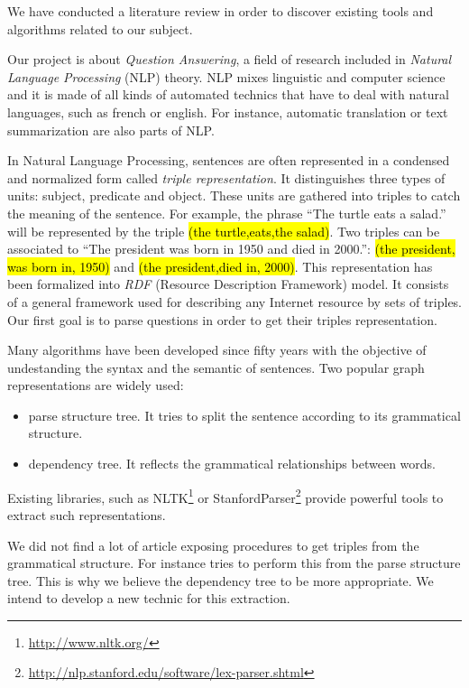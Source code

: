 We have conducted a literature review in order to discover existing tools and algorithms related to our subject. 

Our project is about \textit{Question Answering}, a field of research included in \textit{Natural Language Processing} (NLP) theory. NLP mixes linguistic and computer science and it is made of all kinds of automated technics that have to deal with natural languages, such as french or english. For instance, automatic translation or text summarization are also parts of NLP.

In Natural Language Processing, sentences are often represented in a condensed and normalized form called \textit{triple representation}. It distinguishes three types of units: subject, predicate and object. These units are gathered into triples to catch the meaning of the sentence. For example, the phrase ``The turtle eats a salad.'' will be represented by the triple \hl{(the turtle,eats,the salad)}. Two triples can be associated to ``The president was born in 1950 and died in 2000.'': \hl{(the president, was born in, 1950)} and \hl{(the president,died in, 2000)}. This representation has been formalized into \textit{RDF} (Resource Description Framework) model. It consists of a general framework used for describing any Internet resource by sets of triples. Our first goal is to parse questions in order to get their triples representation.

Many algorithms have been developed since fifty years with the objective of undestanding the syntax and the semantic of sentences. Two popular graph representations are widely used:
\begin{itemize}
 \item parse structure tree. It tries to split the sentence according to its grammatical structure.
 \item dependency tree. It reflects the grammatical relationships between words.
\end{itemize}
Existing libraries, such as NLTK\footnote{\url{http://www.nltk.org/}} or StanfordParser\footnote{\url{http://nlp.stanford.edu/software/lex-parser.shtml}} provide powerful tools to extract such representations.

We did not find a lot of article exposing procedures to get triples from the grammatical structure. For instance \cite{tripleparsetree} tries to perform this from the parse structure tree. This is why we believe the dependency tree to be more appropriate. We intend to develop a new technic for this extraction.

